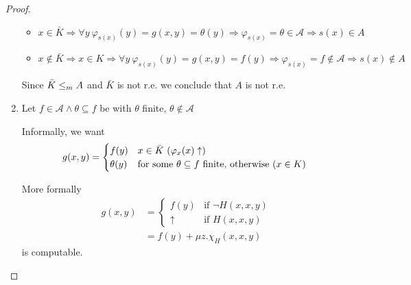 \begin{theorem}
\begin{proof}
\begin{enumerate}
    \begin{itemize}
    \item $ x\in\bar{K} \Rightarrow \forall y\ \varphi_{s(x)}(y) = g(x,y) =
      \theta(y) \Rightarrow \varphi_{s(x)} = \theta \in \mathcal{A} \Rightarrow s(x) \in A $
    \item $ x\not\in\bar{K}\Rightarrow x\in K\Rightarrow\forall
      y\ \varphi_{s(x)}(y) = g(x,y)=f(y)\Rightarrow\varphi_{s(x)}=f \notin \mathcal{A}\Rightarrow
      s(x)\notin{A}$
    \end{itemize}
    Since $ \bar{K} \leq_m A$ and $ \bar{K} $ is not r.e. we conclude that $A$ is
    not r.e.

    \item
    Let $ f\in\mathcal{A}\land\theta\subseteq f $ be with $ \theta $
    finite, $ \theta\not\in\mathcal{A} $

    Informally, we want
    \begin{equation*}
      g(x,y) = \begin{cases}
        f(y) & x \in\bar{K} $ $(\varphi_x(x)\uparrow) \\
        \theta(y) & $for some $ \theta\subseteq f $ finite, otherwise ($ x\in K $) $
      \end{cases}
    \end{equation*}

    More formally
    \begin{align*}
      g(x,y) &= \begin{cases}
        f(y) & \mbox{if } \neg H(x,x,y) \\
        \uparrow & \mbox{if } H(x,x,y)
      \end{cases} \\
      &= f(y) + \mu z . \chi_H(x,x,y)
    \end{align*}
    is computable.


\end{enumerate}
\end{proof}
\end{theorem}
